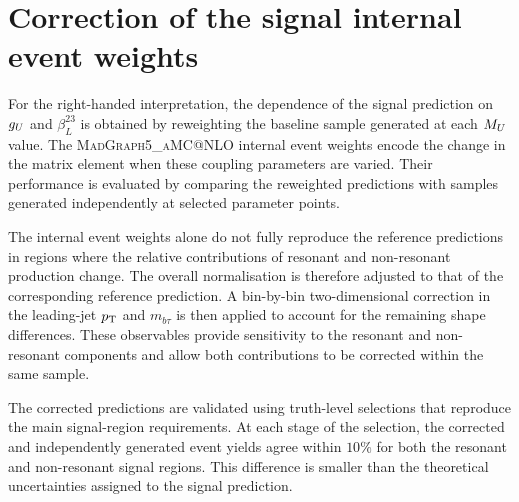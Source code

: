 \chapter{Correction of the signal internal event weights}
\label{app:signal_weight_correction}

For the right-handed interpretation, the dependence of the signal prediction on $g_U$ and $\beta_L^{23}$ is obtained by reweighting the baseline sample generated at each $M_U$ value.
The \textsc{MadGraph5\_aMC@NLO} internal event weights encode the change in the matrix element when these coupling parameters are varied.
Their performance is evaluated by comparing the reweighted predictions with samples generated independently at selected parameter points.

The internal event weights alone do not fully reproduce the reference predictions in regions where the relative contributions of resonant and non-resonant production change.
The overall normalisation is therefore adjusted to that of the corresponding reference prediction.
A bin-by-bin two-dimensional correction in the leading-jet $p_{\mathrm{T}}$ and $m_{b\tau}$ is then applied to account for the remaining shape differences.
These observables provide sensitivity to the resonant and non-resonant components and allow both contributions to be corrected within the same sample.

The corrected predictions are validated using truth-level selections that reproduce the main signal-region requirements.
At each stage of the selection, the corrected and independently generated event yields agree within $10\%$ for both the resonant and non-resonant signal regions.
This difference is smaller than the theoretical uncertainties assigned to the signal prediction.

